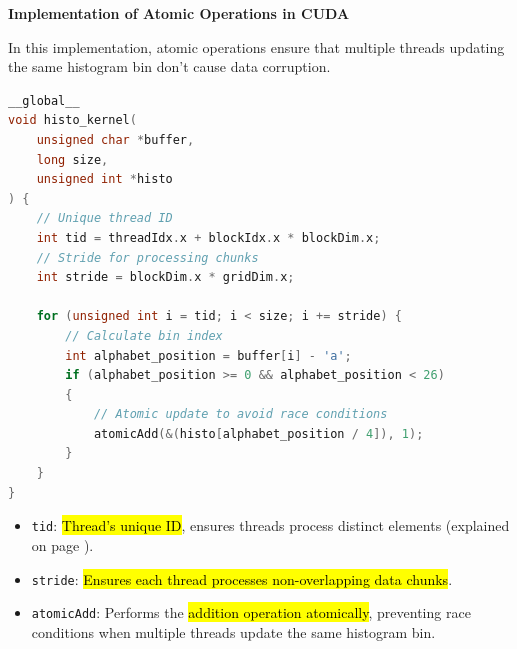 \begin{itemize}
    \begin{flushleft}
        \textcolor{Green3}{ \textbf{Implementation of Atomic Operations in CUDA}}
    \end{flushleft}
    In this implementation, atomic operations ensure that multiple threads updating the same histogram bin don't cause data corruption.
    \begin{lstlisting}[language=c++]
__global__
void histo_kernel(
    unsigned char *buffer,
    long size,
    unsigned int *histo
) {
    // Unique thread ID
    int tid = threadIdx.x + blockIdx.x * blockDim.x;
    // Stride for processing chunks
    int stride = blockDim.x * gridDim.x;

    for (unsigned int i = tid; i < size; i += stride) {
        // Calculate bin index
        int alphabet_position = buffer[i] - 'a';
        if (alphabet_position >= 0 && alphabet_position < 26)
        {
            // Atomic update to avoid race conditions
            atomicAdd(&(histo[alphabet_position / 4]), 1);
        }
    }
}\end{lstlisting}
    \begin{itemize}
        \item \texttt{tid}: \hl{Thread's unique ID}, ensures threads process distinct elements (explained on page ).
        \item \texttt{stride}: \hl{Ensures each thread processes non-overlapping data chunks}.
        \item \texttt{atomicAdd}: Performs the \hl{addition operation atomically}, preventing race conditions when multiple threads update the same histogram bin.
    \end{itemize}


\end{itemize}
